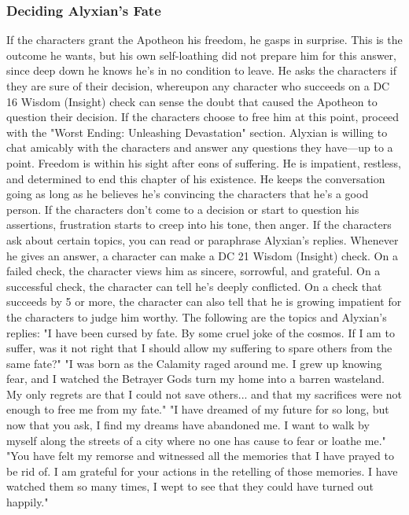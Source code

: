 \documentclass[10pt,a4,twoside,twocolumn,openany,nodeprecatedcode]{dndbook}
\begin{document}
\subsubsection{Deciding Alyxian's Fate}
If the characters grant the Apotheon his freedom, he gasps in surprise. This is the outcome he wants, but his own self-loathing did not prepare him for this answer, since deep down he knows he's in no condition to leave. He asks the characters if they are sure of their decision, whereupon any character who succeeds on a DC 16 Wisdom (Insight) check can sense the doubt that caused the Apotheon to question their decision. If the characters choose to free him at this point, proceed with the "Worst Ending: Unleashing Devastation" section.
Alyxian is willing to chat amicably with the characters and answer any questions they have—up to a point. Freedom is within his sight after eons of suffering. He is impatient, restless, and determined to end this chapter of his existence. He keeps the conversation going as long as he believes he's convincing the characters that he's a good person. If the characters don't come to a decision or start to question his assertions, frustration starts to creep into his tone, then anger.
If the characters ask about certain topics, you can read or paraphrase Alyxian's replies. Whenever he gives an answer, a character can make a DC 21 Wisdom (Insight) check. On a failed check, the character views him as sincere, sorrowful, and grateful. On a successful check, the character can tell he's deeply conflicted. On a check that succeeds by 5 or more, the character can also tell that he is growing impatient for the characters to judge him worthy. The following are the topics and Alyxian's replies:
{{"I have been cursed by fate. By some cruel joke of the cosmos. If I am to suffer, was it not right that I should allow my suffering to spare others from the same fate?"}}
{{"I was born as the Calamity raged around me. I grew up knowing fear, and I watched the Betrayer Gods turn my home into a barren wasteland. My only regrets are that I could not save others... and that my sacrifices were not enough to free me from my fate."}}
{{"I have dreamed of my future for so long, but now that you ask, I find my dreams have abandoned me. I want to walk by myself along the streets of a city where no one has cause to fear or loathe me."}}
{{"You have felt my remorse and witnessed all the memories that I have prayed to be rid of. I am grateful for your actions in the retelling of those memories. I have watched them so many times, I wept to see that they could have turned out happily."}}
\end{document}
